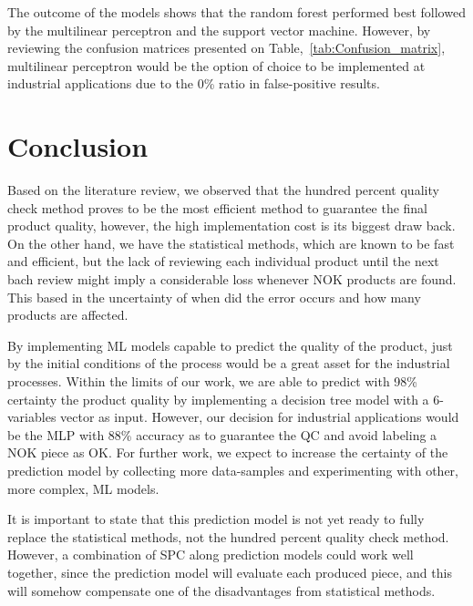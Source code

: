 \documentclass[5p,times,procedia]{elsarticle}
\begin{document}
The outcome of the models shows that the random forest performed best followed by the multilinear perceptron and the support vector machine. However, by reviewing the confusion matrices presented on Table,~\ref{tab:Confusion_matrix}, multilinear perceptron would be the option of choice to be implemented at industrial applications due to the 0\% ratio in false-positive results.

\section{Conclusion}


Based on the literature review, we observed that the hundred percent quality check method proves to be the most efficient method to guarantee the final product quality, however, the high implementation cost is its biggest draw back. On the other hand, we have the statistical methods, which are known to be fast and efficient, but the lack of reviewing each individual product until the next bach review might imply a considerable loss whenever NOK products are found. This based in the uncertainty of when did the error occurs and how many products are affected.

By implementing ML models capable to predict the quality of the product, just by the initial conditions of the process would be a great asset for the industrial processes. Within the limits of our work, we are able to predict with 98\% certainty the product quality by implementing a decision tree model with a 6-variables vector as input. 
However, our decision for industrial applications would be the MLP with 88\% accuracy as to guarantee the QC and avoid labeling a NOK piece as OK. For further work, we expect to increase the certainty of the prediction model by collecting more data-samples and experimenting with other, more complex, ML models.

It is important to state that this prediction model is not yet ready to fully replace the statistical methods, not the hundred percent quality check method. However, a combination of SPC along prediction models could work well together, since the prediction model will evaluate each produced piece, and this will somehow compensate one of the disadvantages from statistical methods.
\end{document}
